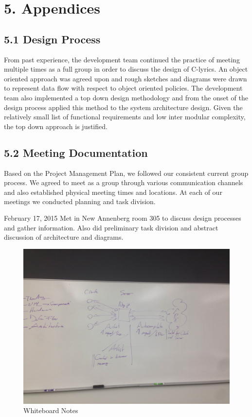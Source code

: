 \documentclass[]{article}
\begin{document}
\section{5. Appendices}\label{appendices}

\subsection{5.1 Design Process}\label{design-process}

From past experience, the development team continued the practice of
meeting multiple times as a full group in order to discuss the design of
C-lyrics. An object oriented approach was agreed upon and rough sketches
and diagrams were drawn to represent data flow with respect to object
oriented policies. The development team also implemented a top down
design methodology and from the onset of the design process applied this
method to the system architecture design. Given the relatively small
list of functional requirements and low inter modular complexity, the
top down approach is justified.

\subsection{5.2 Meeting Documentation}\label{meeting-documentation}

Based on the Project Management Plan, we followed our consistent current
group process. We agreed to meet as a group through various
communication channels and also established physical meeting times and
locations. At each of our meetings we conducted planning and task
division.

February 17, 2015 Met in New Annenberg room 305 to discuss design
processes and gather information. Also did preliminary task division and
abstract discussion of architecture and diagrams.

\begin{figure}[htbp]
\centering
\includegraphics{whiteboard_notes.jpg}
\caption{Whiteboard Notes}
\end{figure}
\end{document}
